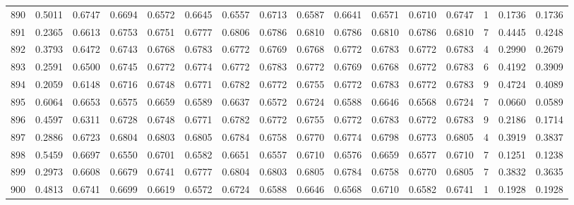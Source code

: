 \begin{tabular}{lrrrrrrrrrrrrrrr}
890 &      0.5011 &  0.6747 &  0.6694 &  0.6572 &  0.6645 &  0.6557 &  0.6713 &  0.6587 &  0.6641 &  0.6571 &   0.6710 &     0.6747 &      1 &                    0.1736 &                     0.1736 \\
891 &      0.2365 &  0.6613 &  0.6753 &  0.6751 &  0.6777 &  0.6806 &  0.6786 &  0.6810 &  0.6786 &  0.6810 &   0.6786 &     0.6810 &      7 &                    0.4445 &                     0.4248 \\
892 &      0.3793 &  0.6472 &  0.6743 &  0.6768 &  0.6783 &  0.6772 &  0.6769 &  0.6768 &  0.6772 &  0.6783 &   0.6772 &     0.6783 &      4 &                    0.2990 &                     0.2679 \\
893 &      0.2591 &  0.6500 &  0.6745 &  0.6772 &  0.6774 &  0.6772 &  0.6783 &  0.6772 &  0.6769 &  0.6768 &   0.6772 &     0.6783 &      6 &                    0.4192 &                     0.3909 \\
894 &      0.2059 &  0.6148 &  0.6716 &  0.6748 &  0.6771 &  0.6782 &  0.6772 &  0.6755 &  0.6772 &  0.6783 &   0.6772 &     0.6783 &      9 &                    0.4724 &                     0.4089 \\
895 &      0.6064 &  0.6653 &  0.6575 &  0.6659 &  0.6589 &  0.6637 &  0.6572 &  0.6724 &  0.6588 &  0.6646 &   0.6568 &     0.6724 &      7 &                    0.0660 &                     0.0589 \\
896 &      0.4597 &  0.6311 &  0.6728 &  0.6748 &  0.6771 &  0.6782 &  0.6772 &  0.6755 &  0.6772 &  0.6783 &   0.6772 &     0.6783 &      9 &                    0.2186 &                     0.1714 \\
897 &      0.2886 &  0.6723 &  0.6804 &  0.6803 &  0.6805 &  0.6784 &  0.6758 &  0.6770 &  0.6774 &  0.6798 &   0.6773 &     0.6805 &      4 &                    0.3919 &                     0.3837 \\
898 &      0.5459 &  0.6697 &  0.6550 &  0.6701 &  0.6582 &  0.6651 &  0.6557 &  0.6710 &  0.6576 &  0.6659 &   0.6577 &     0.6710 &      7 &                    0.1251 &                     0.1238 \\
899 &      0.2973 &  0.6608 &  0.6679 &  0.6741 &  0.6777 &  0.6804 &  0.6803 &  0.6805 &  0.6784 &  0.6758 &   0.6770 &     0.6805 &      7 &                    0.3832 &                     0.3635 \\
900 &      0.4813 &  0.6741 &  0.6699 &  0.6619 &  0.6572 &  0.6724 &  0.6588 &  0.6646 &  0.6568 &  0.6710 &   0.6582 &     0.6741 &      1 &                    0.1928 &                     0.1928 \\

\end{tabular}
